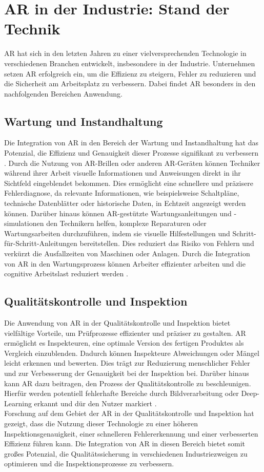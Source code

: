 \section{AR in der Industrie: Stand der Technik}

AR hat sich in den letzten Jahren zu einer vielversprechenden Technologie in
verschiedenen Branchen entwickelt, insbesondere in der Industrie. Unternehmen
setzen AR erfolgreich ein, um die Effizienz zu steigern, Fehler zu reduzieren
und die Sicherheit am Arbeitsplatz zu verbessern. Dabei findet AR besonders in
den nachfolgenden Bereichen Anwendung.

\subsection{Wartung und Instandhaltung}
Die Integration von AR in den Bereich der Wartung und Instandhaltung hat das
Potenzial, die Effizienz und Genauigkeit dieser Prozesse signifikant zu
verbessern \cite{liu2022probing}. Durch die Nutzung von AR-Brillen oder anderen
AR-Geräten können Techniker während ihrer Arbeit visuelle Informationen und
Anweisungen direkt in ihr Sichtfeld eingeblendet bekommen. Dies ermöglicht eine
schnellere und präzisere Fehlerdiagnose, da relevante Informationen, wie
beispielsweise Schaltpläne, technische Datenblätter oder historische Daten, in
Echtzeit angezeigt werden können. Darüber hinaus können AR-gestützte
Wartungsanleitungen und -simulationen den Technikern helfen, komplexe
Reparaturen oder Wartungsarbeiten durchzuführen, indem sie visuelle
Hilfestellungen und Schritt-für-Schritt-Anleitungen bereitstellen.
\cite{4079262} Dies reduziert das Risiko von Fehlern und verkürzt die
Ausfallzeiten von Maschinen oder Anlagen. Durch die Integration von AR in den
Wartungsprozess können Arbeiter effizienter arbeiten und die cognitive
Arbeitslast reduziert werden \cite{5620905}.

\subsection{Qualitätskontrolle und Inspektion}
Die Anwendung von AR in der Qualitätskontrolle und Inspektion bietet
vielfältige Vorteile, um Prüfprozesse effizienter und präziser zu gestalten. AR
ermöglicht es Inspekteuren, eine optimale Version des fertigen Produktes als
Vergleich einzublenden. Dadurch können Inspekteure Abweichungen oder Mängel
leicht erkennen und bewerten. Dies trägt zur Reduzierung menschlicher Fehler
und zur Verbesserung der Genauigkeit bei der Inspektion bei. Darüber hinaus
kann AR dazu beitragen, den Prozess der Qualitätskontrolle zu beschleunigen.
Hierfür werden potentiell fehlerhafte Bereiche durch Bildverarbeitung oder
Deep-Learning erkannt und dür den Nutzer markiert \cite{9112336}. \\Forschung
auf dem Gebiet der AR in der Qualitätskontrolle und Inspektion hat gezeigt,
dass die Nutzung dieser Technologie zu einer höheren Inspektionsgenauigkeit,
einer schnelleren Fehlererkennung und einer verbesserten Effizienz führen kann.
Die Integration von AR in diesen Bereich bietet somit großes Potenzial, die
Qualitätssicherung in verschiedenen Industriezweigen zu optimieren und die
Inspektionsprozesse zu verbessern.\cite{etonam2019augmented}